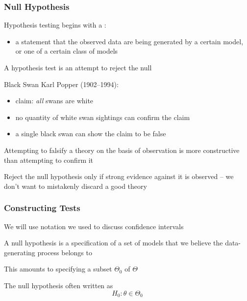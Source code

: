 \begin{frame}\frametitle{Null Hypothesis}

    \vspace{2em}
    Hypothesis testing begins with a :
    \begin{itemize}
        \item a statement that the observed data are being generated by a certain
    model, or one of a certain class of models
    \end{itemize}
    
    \vspace{.7em}
    A hypothesis test is an attempt to reject the
    null
    
\end{frame}

\begin{frame}
    
    \vspace{2em}
    Black Swan Karl Popper (1902--1994):
    \begin{itemize}
        \item  claim: \emph{all} swans are white
        \item   no
    quantity of white swan sightings can confirm the claim 
        \item  a single
    black swan can show the claim to be false
    \end{itemize}
    
    \vspace{.7em}
    Attempting to
    falsify a theory on the basis of observation is more
    constructive than attempting to confirm it
    
    Reject the null hypothesis only if strong
    evidence against it is observed -- we
    don't want to mistakenly discard a good theory

\end{frame}

\begin{frame}\frametitle{Constructing Tests}
    
    \vspace{2em}
    We will use notation we used to discuss confidence intervals
    
    A null hypothesis is
    a specification of a set of models that we believe the data-generating process
    belongs to
    
    This amounts to specifying a subset $\Theta_0$ of $\Theta$
    
    The
    null hypothesis often written as 
    \begin{equation*}
        H_0 \colon \theta \in \Theta_0
    \end{equation*}
\end{frame}

